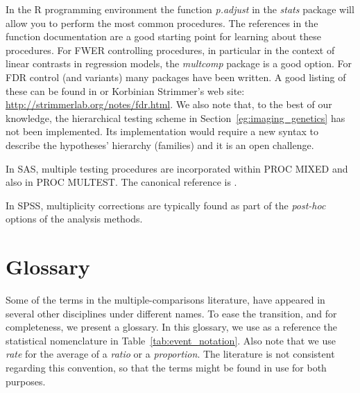\documentclass[review,12pt]{article}
\theoremstyle{definition}
\theoremstyle{definition}
\begin{document}
In the R programming environment \citep{r_development_core_team_r:_2011} the function \emph{p.adjust} in the \emph{stats} package will allow you to perform the most common procedures. The references in the function documentation are a good starting point for learning about these procedures. 
For FWER controlling procedures, in particular in the context of linear contrasts in regression models, the \emph{multcomp} package is a good option. 
For FDR control (and variants) many packages have been written. A good listing of these can be found in \citet{bretz_multiple_2010} or Korbinian Strimmer's web site: \url{http://strimmerlab.org/notes/fdr.html}. 
We also note that, to the best of our knowledge, the hierarchical testing scheme in Section~\ref{eg:imaging_genetics} has not been implemented. Its implementation would require a new syntax to describe the hypotheses' hierarchy (families) and it is an open challenge. 

In SAS, multiple testing procedures are incorporated within PROC MIXED and also in PROC MULTEST.  The canonical reference is \citet{westfall_multiple_2011}. 

In SPSS, multiplicity corrections are typically found as part of the \emph{post-hoc} options of the analysis methods.



\section{\label{sec:glossary} Glossary}
Some of the terms in the multiple-comparisons literature, have appeared in several other disciplines under different names. To ease the transition, and for completeness, we present a glossary. 
In this glossary, we use as a reference the statistical nomenclature in Table~\ref{tab:event_notation}. Also note that we use \emph{rate} for the average of a \emph{ratio} or a \emph{proportion}. The literature is not consistent regarding this convention, so that the terms might be found in use for both purposes.
\end{document}
